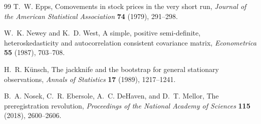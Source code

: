 \documentclass[11pt]{article}
\begin{document}
\begin{thebibliography}{99}
 T.~W. Epps, Comovements in stock prices in the very
short run, \emph{Journal of the American Statistical Association}
\textbf{74} (1979), 291--298.

 W.~K. Newey and K.~D. West, A simple, positive
semi-definite, heteroskedasticity and autocorrelation consistent
covariance matrix, \emph{Econometrica} \textbf{55} (1987), 703--708.

 H.~R. K\"unsch, The jackknife and the bootstrap
for general stationary observations, \emph{Annals of Statistics}
\textbf{17} (1989), 1217--1241.

 B.~A. Nosek, C.~R. Ebersole, A.~C. DeHaven, and
D.~T. Mellor, The preregistration revolution, \emph{Proceedings of the
National Academy of Sciences} \textbf{115} (2018), 2600--2606.

\end{thebibliography}
\end{document}
